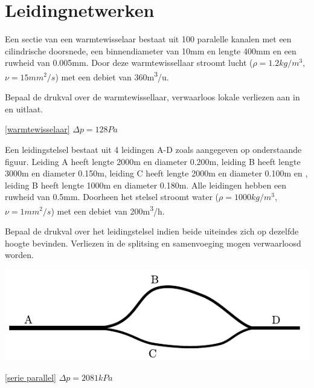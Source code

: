 \chapter{Leidingnetwerken}
\label{sec:Leidingnetwerken}
\begin{toepassing}[*]
	\label{warmtewisselaar}
Een sectie van een warmtewisselaar bestaat uit 100 paralelle kanalen met een cilindrische doorsnede, een binnendiameter van 10mm en lengte 400mm en een ruwheid van 0.005mm. Door deze warmtewissellaar stroomt lucht ($\rho=1.2\unit{kg/m^3}$, $\nu=15\unit{mm^2/s}$) met een debiet van 360\unit{m^3/u}.
		
Bepaal de drukval over de warmtewissellaar, verwaarloos lokale verliezen aan in en uitlaat.	
\end{toepassing}
\begin{antwoord}{\ref{warmtewisselaar}}
	$\Delta p = 128\unit{Pa}$
\end{antwoord}
\begin{toepassing}[*]
	\label{serie parallel}
Een leidingstelsel bestaat uit 4 leidingen A-D zoals aangegeven op onderstaande figuur. Leiding A heeft lengte 2000m en diameter 0.200m, leiding B heeft lengte 3000m en diameter 0.150m, leiding C heeft lengte 2000m en diameter 0.100m en , leiding B heeft lengte 1000m en diameter 0.180m. Alle leidingen hebben een ruwheid van 0.5mm. Doorheen het stelsel stroomt water ($\rho=1000\unit{kg/m^3}$, $\nu=1\unit{mm^2/s}$) met een debiet van 200\unit{m^3/h}.

Bepaal de drukval over het leidingstelsel indien beide uiteindes zich op dezelfde hoogte bevinden. Verliezen in de splitsing en samenvoeging mogen verwaarloosd worden.

	\centering
	\includegraphics{fig/leidingnetwerken/serie_parallel}
\end{toepassing}
\begin{antwoord}{\ref{serie parallel}}
	$\Delta p = 2081\unit{kPa}$
\end{antwoord}
